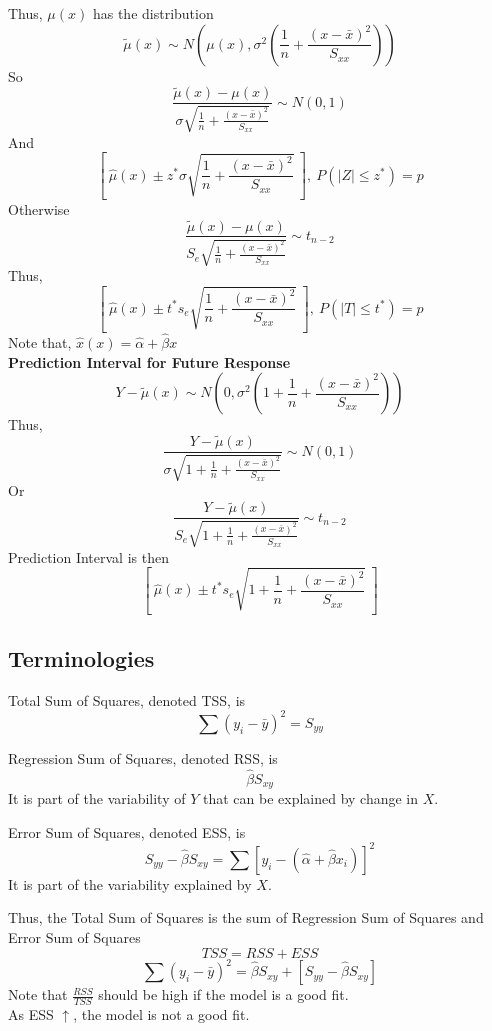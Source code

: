 \documentclass[12pt]{article}
\theoremstyle{definition}
\begin{document}
  Thus, $\mu(x)$ has the distribution
  $$\widetilde{\mu}(x) \sim N\left(\mu(x), \sigma^{2}\left(\frac{1}{n} + \frac{(x - \bar{x})^{2}}{S_{xx}}\right)\right)$$
  So
  $$\frac{\widetilde{\mu}(x) - \mu(x)}{\sigma\sqrt{\frac{1}{n} + \frac{(x - \bar{x})^{2}}{S_{xx}}}} \sim N(0, 1)$$
  And
  $$\left[~\hat{\mu}(x) \pm z^{*}\sigma\sqrt{\frac{1}{n} + \frac{(x - \bar{x})^{2}}{S_{xx}}}~\right], ~P(|Z| \leq z^{*}) = p$$
  \newline
  Otherwise
  $$\frac{\widetilde{\mu}(x) - \mu(x)}{S_{e}\sqrt{\frac{1}{n} + \frac{(x - \bar{x})^{2}}{S_{xx}}}} \sim t_{n-2}$$
  Thus,
  $$\left[~\hat{\mu}(x) \pm t^{*}s_{e}\sqrt{\frac{1}{n} + \frac{(x - \bar{x})^{2}}{S_{xx}}}~\right], ~P(|T| \leq t^{*}) = p$$
  \newline
  Note that, $\hat{x}(x) = \hat{\alpha} + \hat{\beta}x$ \\
  \newline
  \textbf{Prediction Interval for Future Response} \\
  $$Y - \widetilde{\mu}(x) \sim N\left(0, \sigma^{2}\left(1 + \frac{1}{n} + \frac{(x - \bar{x})^{2}}{S_{xx}}\right)\right)$$
  Thus,
  $$\frac{Y - \widetilde{\mu}(x)}{\sigma\sqrt{1 + \frac{1}{n} + \frac{(x - \bar{x})^{2}}{S_{xx}}}} \sim N(0, 1)$$
  Or
  $$\frac{Y - \widetilde{\mu}(x)}{S_{e}\sqrt{1 + \frac{1}{n} + \frac{(x - \bar{x})^{2}}{S_{xx}}}} \sim t_{n-2}$$
  \newline
  Prediction Interval is then
  $$\left[~\hat{\mu}(x) \pm t^{*}s_{e}\sqrt{1 + \frac{1}{n} + \frac{(x - \bar{x})^{2}}{S_{xx}}} ~\right]$$

  \subsection{Terminologies}
  Total Sum of Squares, denoted TSS, is
  $$\sum (y_{i} - \bar{y})^{2} = S_{yy}$$

  Regression Sum of Squares, denoted RSS, is
  $$\hat{\beta}S_{xy}$$
  It is part of the variability of $Y$ that can be explained by change in $X$.

  Error Sum of Squares, denoted ESS, is
  $$S_{yy} - \hat{\beta}S_{xy} = \sum [y_{i} - (\hat{\alpha} + \hat{\beta}x_{i})]^{2}$$
  It is part of the variability explained by $X$.

  Thus, the Total Sum of Squares is the sum of Regression Sum of Squares and Error Sum of Squares
  $$TSS = RSS + ESS$$
  $$\sum (y_{i} - \bar{y})^{2} = \hat{\beta}S_{xy} + [S_{yy} - \hat{\beta}S_{xy}]$$
  Note that $\frac{RSS}{TSS}$ should be high if the model is a good fit. \\
  As ESS $\uparrow$, the model is not a good fit.
\end{document}
